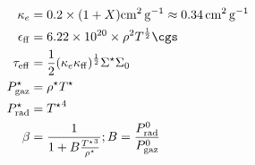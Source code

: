 \begin{align}
    \kappa_e &= 0.2 \times (1 + X) \si{\square\centi\meter\per\gram} \approx \SI{0.34}{\square\centi\meter\per\gram} \\
    \epsilon_\mathrm{ff} &= \num{6.22e20} \times \rho^2 T^\frac{1}{2} \si{\cgs} \\
    \tau_\mathrm{eff} &= \frac{1}{2} (\kappa_e \kappa_\mathrm{ff})^\frac{1}{2} \Sigma^\star \Sigma_0 \\
    P_\mathrm{gaz}^\star &= \rho^\star T^\star \\
    P_\mathrm{rad}^\star &= {T^\star}^4 \\
    \beta &= \frac{1}{1 + B \frac{{T^\star}^3}{\rho^\star}} ; B = \frac{P_\mathrm{rad}^0}{P_\mathrm{gaz}^0} \\
\end{align}
